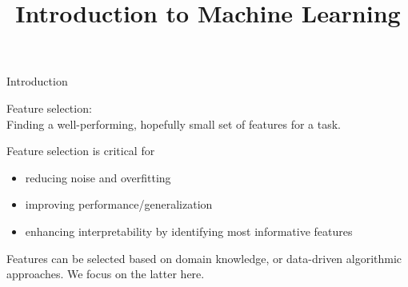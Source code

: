 \documentclass[11pt,compress,t,notes=noshow, xcolor=table]{beamer}
\title{Introduction to Machine Learning}
\begin{document}
    

\begin{vbframe}{Introduction}

    Feature selection: \\
    Finding a well-performing, 
    hopefully small set of features for a task.
    

    \lz
    Feature selection is critical for 
    \begin{itemize}
       \item reducing noise and overfitting
       \item improving performance/generalization
       \item enhancing interpretability by identifying most informative features
    \end{itemize}

 \vspace{0.5cm}
   

    Features can be selected based on domain knowledge, or data-driven algorithmic approaches. We focus on the latter here.
  \end{vbframe}


%
%
\end{document}
